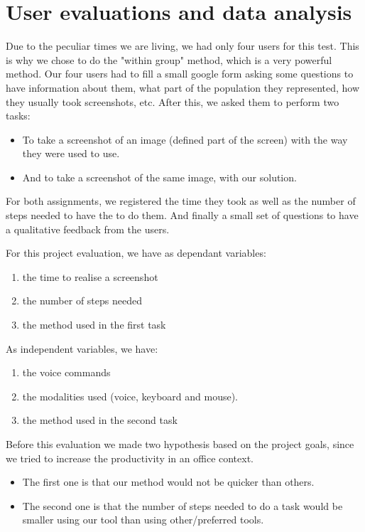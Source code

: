 \section{User evaluations and data analysis}
Due to the peculiar times we are living, we had only four users for this test. This is why we chose to do the "within group" method, which is a very powerful method.
Our four users had to fill a small google form asking some questions to have information about them, what part of the population they represented, how they usually took screenshots, etc.
After this, we asked them to perform two tasks:
\begin{itemize}
\item To take a screenshot of an image (defined part of the screen) with the way they were used to use.
\item And to take a screenshot of the same image, with our solution.
\end{itemize}
For both assignments, we registered the time they took as well as the number of steps needed to have the to do them.
And finally a small set of questions to have a qualitative feedback from the users.

For this project evaluation, we have as dependant variables:
\begin{enumerate}
\item the time to realise a screenshot
\item the number of steps needed
\item the method used in the first task
\end{enumerate}

As independent variables, we have:
\begin{enumerate}
\item the voice commands 
\item the modalities used (voice, keyboard and mouse).
\item the method used in the second task
\end{enumerate}

Before this evaluation we made two hypothesis based on the project goals, since we tried to increase the productivity in an office context.
\begin{itemize}
\item The first one is that our method would not be quicker than others.
\item The second one is that the number of steps needed to do a task would be smaller using our tool than using other/preferred tools.
\end{itemize}
